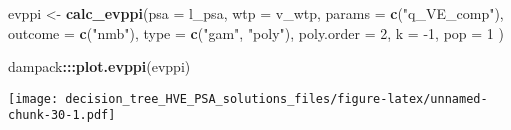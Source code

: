 \documentclass[
]{article}
\newenvironment{Shaded}{\begin{snugshade}}{\end{snugshade}}
\newcommand{\DataTypeTok}[1]{\textcolor[rgb]{0.13,0.29,0.53}{#1}}
\newcommand{\DecValTok}[1]{\textcolor[rgb]{0.00,0.00,0.81}{#1}}
\newcommand{\KeywordTok}[1]{\textcolor[rgb]{0.13,0.29,0.53}{\textbf{#1}}}
\newcommand{\NormalTok}[1]{#1}
\newcommand{\OperatorTok}[1]{\textcolor[rgb]{0.81,0.36,0.00}{\textbf{#1}}}
\newcommand{\StringTok}[1]{\textcolor[rgb]{0.31,0.60,0.02}{#1}}
\begin{document}
\begin{Shaded}
\begin{Highlighting}[]
\NormalTok{evppi <-}\StringTok{ }\KeywordTok{calc_evppi}\NormalTok{(}\DataTypeTok{psa =}\NormalTok{ l_psa, }
                    \DataTypeTok{wtp =}\NormalTok{ v_wtp, }
                    \DataTypeTok{params =} \KeywordTok{c}\NormalTok{(}\StringTok{"q_VE_comp"}\NormalTok{), }
                    \DataTypeTok{outcome =} \KeywordTok{c}\NormalTok{(}\StringTok{"nmb"}\NormalTok{),}
                    \DataTypeTok{type =} \KeywordTok{c}\NormalTok{(}\StringTok{"gam"}\NormalTok{, }\StringTok{"poly"}\NormalTok{),}
                    \DataTypeTok{poly.order =} \DecValTok{2}\NormalTok{,}
                    \DataTypeTok{k =} \DecValTok{-1}\NormalTok{,}
                    \DataTypeTok{pop =} \DecValTok{1}
\NormalTok{)}

\NormalTok{dampack}\OperatorTok{:::}\KeywordTok{plot.evppi}\NormalTok{(evppi)}
\end{Highlighting}
\end{Shaded}

\texttt{[image: decision\_tree\_HVE\_PSA\_solutions\_files/figure-latex/unnamed-chunk-30-1.pdf]}
\end{document}
